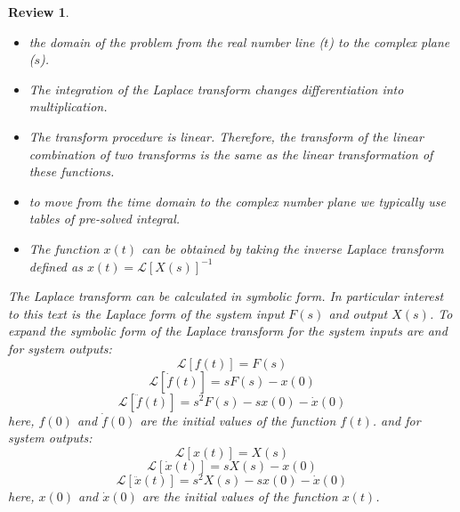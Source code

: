 \documentclass[12pt,letter]{article}
\numberwithin{ex}{section} %
\newtheorem{re}{Review}
\numberwithin{re}{section} %
\newenvironment{review}{\begin{mdframed}[middlelinewidth=2mm,roundcorner=20pt]\begin{re}\normalfont}{\end{re}\end{mdframed}}
\newcommand{\Laplace}[1]{\ensuremath{\mathcal{L}{\left[#1\right]}}}
\begin{document}
\begin{review}
		\begin{itemize}
			\item the domain of the problem from the real number line ($t$) to the complex plane ($s$).
			\item The integration of the Laplace transform changes differentiation into multiplication.
			\item The transform procedure is linear. Therefore, the transform of the linear combination of two transforms is the same as the linear transformation of these functions. 
			\item to move from the time domain to the complex number plane we typically use tables of pre-solved integral. 
			\item The function $x(t)$ can be obtained by taking the inverse Laplace transform defined as $x(t) = \Laplace{X(s)}^{-1}$
		\end{itemize}

			The Laplace transform can be calculated in symbolic form. In particular interest to this text is the Laplace form of the system input $F(s)$ and output $X(s)$. To expand the symbolic form of the Laplace transform for the system inputs are 
			and for system outputs:
			\begin{equation}
				\label{eq:laplace_f}
				\Laplace{f(t)} = F(s)
			\end{equation}		
			\begin{equation}
				\label{eq:laplace_f'}
				\Laplace{\dot{f}(t)} = sF(s)-x(0)
			\end{equation}	
			\begin{equation}
				\label{eq:laplace_f''}
				\Laplace{\ddot{f}(t)} = s^2F(s)-sx(0) - \dot{x}(0)
			\end{equation}	
			here, $f(0)$ and $\dot{f}(0)$ are the initial values of the function $f(t)$. 				
			and for system outputs:
			\begin{equation}
				\label{eq:laplace_x}
				\Laplace{x(t)} = X(s)
			\end{equation}		
			\begin{equation}
				\label{eq:laplace_x'}
				\Laplace{\dot{x}(t)} = sX(s)-x(0)
			\end{equation}	
			\begin{equation}
				\label{eq:laplace_x''}
				\Laplace{\ddot{x}(t)} = s^2X(s)-sx(0) - \dot{x}(0)
			\end{equation}	
			here, $x(0)$ and $\dot{x}(0)$ are the initial values of the function $x(t)$. 		
	
\end{review}
\end{document}

